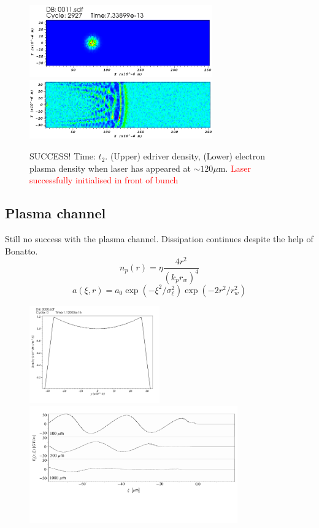 \documentclass[%
onecolumn, notitlepage,
 amsmath,amssymb,
 aps,
]{article}
\begin{document}
\begin{figure}[!ht]
\centering
\includegraphics[width=0.7\textwidth]{buncht2copy.png}\\
\includegraphics[width=0.7\textwidth]{lasert2copy.png}
\caption{SUCCESS! Time: $t_2$. (Upper) edriver density, (Lower) electron plasma density when laser has appeared at $\sim 120 \mu$m.  \textcolor{red}{Laser successfully initialised in front of bunch}}
\end{figure}
\clearpage
\subsection*{Plasma channel}
Still no success with the plasma channel. Dissipation continues despite the help of Bonatto. 
\begin{equation}
n_p(r)=\eta\frac{4r^2}{(k_pr_w)^4}
\end{equation} 
\begin{equation}
a(\xi,r)=a_0\exp(-\xi^2/\sigma^2_{\ell})\exp(-2r^2/r_w^2)
\end{equation}
\begin{figure}[!ht]
\centering
\includegraphics[width=0.5\textwidth]{visit0000.png}\\
\includegraphics[width=0.8\textwidth]{laser}
\end{figure}
\end{document}
